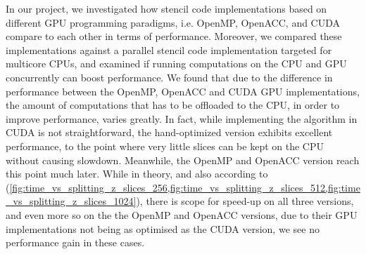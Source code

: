 

In our project, we investigated how stencil code implementations based on different GPU programming paradigms, i.e. OpenMP, OpenACC, and CUDA compare to each other in terms of performance.
Moreover, we compared these implementations against a parallel stencil code implementation targeted for multicore CPUs, and examined if running computations on the CPU and GPU concurrently can boost performance.
We found that due to the difference in performance between the OpenMP, OpenACC and CUDA GPU implementations, the amount of computations that has to be offloaded to the CPU, in order to improve performance, varies greatly.
In fact, while implementing the algorithm in CUDA is not straightforward, the hand-optimized version exhibits excellent performance, to the point where very little slices can be kept on the CPU without causing slowdown.
Meanwhile, the OpenMP and OpenACC version reach this point much later.
While in theory, and also according to (\cref{fig:time_vs_splitting_z_slices_256,fig:time_vs_splitting_z_slices_512,fig:time_vs_splitting_z_slices_1024}), there is scope for speed-up on all three versions, and even more so on the the OpenMP and OpenACC versions, due to their GPU implementations not being as optimised as the CUDA version, we see no performance gain in these cases. 

\vfill